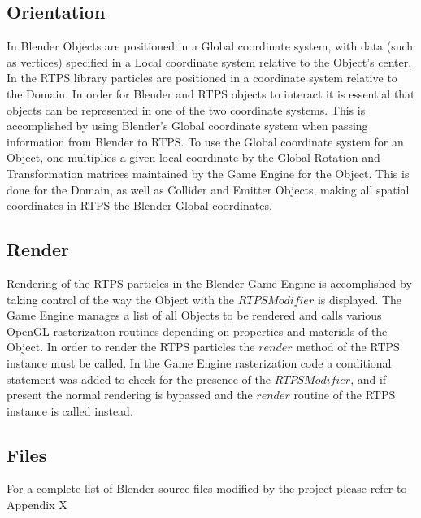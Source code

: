 \subsection{Orientation}
In Blender Objects are positioned in a Global coordinate system, with data
(such as vertices) specified in a Local coordinate system relative to the
Object's center. In the RTPS library particles are positioned in a coordinate
system relative to the Domain. In order for Blender and RTPS objects to
interact it is essential that objects can be represented in one of the two
coordinate systems. This is accomplished by using Blender's Global coordinate
system when passing information from Blender to RTPS. To use the Global
coordinate system for an Object, one multiplies a given local coordinate by the
Global Rotation and Transformation matrices maintained by the Game Engine for
the Object. This is done for the Domain, as well as Collider and Emitter
Objects, making all spatial coordinates in RTPS the Blender Global coordinates.

\subsection{Render}
Rendering of the RTPS particles in the Blender Game Engine is accomplished by
taking control of the way the Object with the $RTPS Modifier$ is displayed. The
Game Engine manages a list of all Objects to be rendered and calls various
OpenGL rasterization routines depending on properties and materials of the
Object. In order to render the RTPS particles the $render$ method of the RTPS
instance must be called. In the Game Engine rasterization code a conditional
statement was added to check for the presence of the $RTPS Modifier$, and if
present the normal rendering is bypassed and the $render$ routine of the RTPS
instance is called instead.

\subsection{Files}
For a complete list of Blender source files modified by the project please refer to Appendix X

